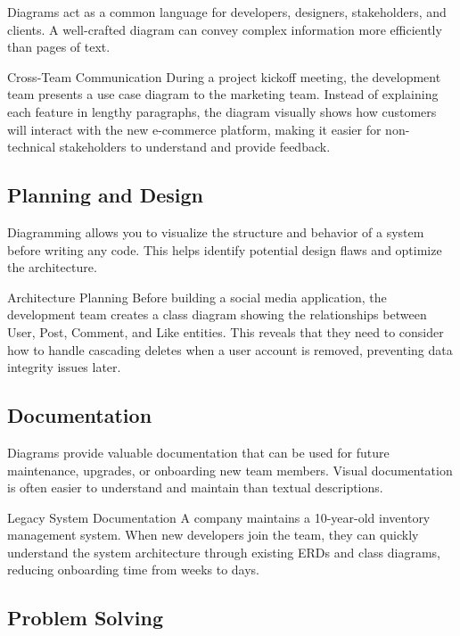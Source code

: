 Diagrams act as a common language for developers, designers, stakeholders, and clients. A well-crafted diagram can convey complex information more efficiently than pages of text.

\begin{examplecard}{Cross-Team Communication}
  During a project kickoff meeting, the development team presents a use case diagram to the marketing team. Instead of explaining each feature in lengthy paragraphs, the diagram visually shows how customers will interact with the new e-commerce platform, making it easier for non-technical stakeholders to understand and provide feedback.
\end{examplecard}

\subsection{Planning and Design}

Diagramming allows you to visualize the structure and behavior of a system before writing any code. This helps identify potential design flaws and optimize the architecture.

\begin{examplecard}{Architecture Planning}
  Before building a social media application, the development team creates a class diagram showing the relationships between User, Post, Comment, and Like entities. This reveals that they need to consider how to handle cascading deletes when a user account is removed, preventing data integrity issues later.
\end{examplecard}

\subsection{Documentation}

Diagrams provide valuable documentation that can be used for future maintenance, upgrades, or onboarding new team members. Visual documentation is often easier to understand and maintain than textual descriptions.

\begin{examplecard}{Legacy System Documentation}
  A company maintains a 10-year-old inventory management system. When new developers join the team, they can quickly understand the system architecture through existing ERDs and class diagrams, reducing onboarding time from weeks to days.
\end{examplecard}

\subsection{Problem Solving}

